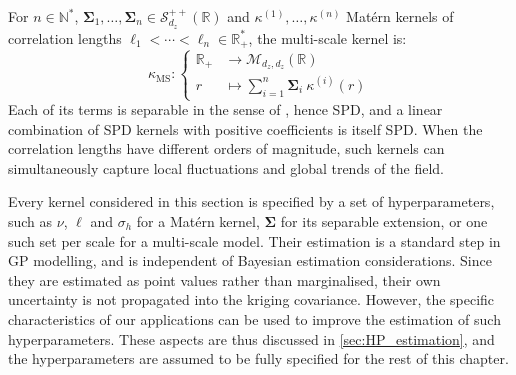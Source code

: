 \begin{remark}
	For $n\in\mathbb{N}^*$, $\boldsymbol{\Sigma}_1,\dots,\boldsymbol{\Sigma}_n\in\mathcal{S}_{d_z}^{++}(\mathbb{R})$ and $\kappa^{(1)},\dots,\kappa^{(n)}$ Matérn kernels of correlation lengths $\ell_1<\cdots<\ell_n\in\mathbb{R}_+^*$, the multi-scale kernel is:
	\begin{equation}
		\kappa_{\mathrm{MS}}:\left\{\begin{aligned}
		\mathbb{R}_+&\to\mathcal{M}_{d_z,d_z}(\mathbb{R})\\
		r&\mapsto\sum_{i=1}^n\boldsymbol{\Sigma}_i\:\kappa^{(i)}(r)
		\end{aligned}\right.
	\end{equation}
	Each of its terms is separable in the sense of , hence SPD, and a linear combination of SPD kernels with positive coefficients is itself SPD. When the correlation lengths have different orders of magnitude, such kernels can simultaneously capture local fluctuations and global trends of the field.
\end{remark}

Every kernel considered in this section is specified by a set of hyperparameters, such as $\nu$, $\ell$ and $\sigma_h$ for a Matérn kernel, $\boldsymbol{\Sigma}$ for its separable extension, or one such set per scale for a multi-scale model. Their estimation is a standard step in GP modelling, and is independent of Bayesian estimation considerations. Since they are estimated as point values rather than marginalised, their own uncertainty is not propagated into the kriging covariance. However, the specific characteristics of our applications can be used to improve the estimation of such hyperparameters. These aspects are thus discussed in \cref{sec:HP_estimation}, and the hyperparameters are assumed to be fully specified for the rest of this chapter.
